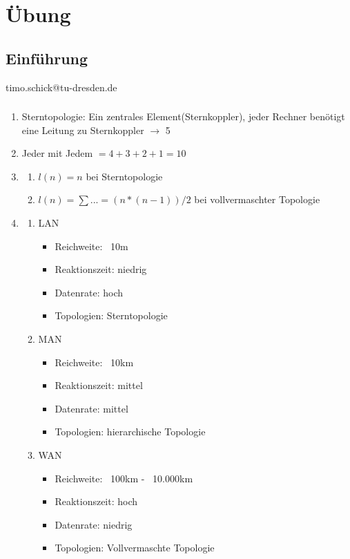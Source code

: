 
\chapter{Übung}

\section{Einführung}
timo.schick@tu-dresden.de

\subsection{}
\begin{enumerate}
	\item Sterntopologie: Ein zentrales Element(Sternkoppler), jeder 				Rechner benötigt eine Leitung zu Sternkoppler \(\to\) 5
	\item Jeder mit Jedem \(= 4+3+2+1=10\)
	\item
	\begin{enumerate}
		\item \(l(n)= n\) bei Sterntopologie
		\item \(l(n) = \sum ... = (n*(n-1))/2\) bei vollvermaschter 					Topologie
	\end{enumerate}
	\item
	\begin{enumerate}
		\item LAN
		\begin{itemize}
			\item Reichweite: ~10m
			\item Reaktionszeit: niedrig
			\item Datenrate: hoch
			\item Topologien: Sterntopologie
		\end{itemize}
		\item MAN
		\begin{itemize}
			\item Reichweite: ~10km
			\item Reaktionszeit: mittel
			\item Datenrate: mittel
			\item Topologien: hierarchische Topologie
		\end{itemize}
		\item WAN
		\begin{itemize}
			\item Reichweite: ~100km - ~10.000km
			\item Reaktionszeit: hoch
			\item Datenrate: niedrig
			\item Topologien: Vollvermaschte Topologie
		\end{itemize}
	\end{enumerate}
\end{enumerate}

